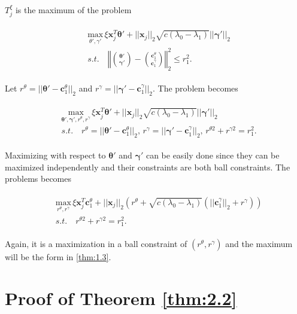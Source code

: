 $T_j^\xi$ is the maximum of the problem

\begin{gather}
    \begin{aligned}
        &\underset{\theta',\gamma'}{\mathrm{max}}\,\xi \boldsymbol x_j^T\boldsymbol\theta'+||\boldsymbol x_j||_2\sqrt{c(\lambda_0-\lambda_1)}||\boldsymbol\gamma'||_2\\
        &s.t.\quad \left\Vert\binom{\boldsymbol\theta'}{\boldsymbol\gamma'}-\binom{\boldsymbol c_1^\theta}{\boldsymbol c_1^\gamma}\right\Vert^2_2\leq r_1^2.
    \end{aligned}
\end{gather}

Let $r^\theta=||\boldsymbol\theta'-\boldsymbol c_1^\theta||_2$ and $r^\gamma=||\boldsymbol\gamma'-\boldsymbol c_1^\gamma||_2$. The problem becomes

\begin{gather}
    \begin{aligned}
        &\underset{\boldsymbol\theta',\boldsymbol\gamma',r^\theta,r^\gamma}{\mathrm{max}}\,\xi \boldsymbol x_j^T\boldsymbol\theta'+||\boldsymbol x_j||_2\sqrt{c(\lambda_0-\lambda_1)}||\boldsymbol\gamma'||_2\\
        &s.t.\quad r^\theta=||\boldsymbol\theta'-\boldsymbol c_1^\theta||_2,\,r^\gamma=||\boldsymbol\gamma'-\boldsymbol c_1^\gamma||_2,\,r^{\theta2}+r^{\gamma2}=r_1^2.
    \end{aligned}
\end{gather}

Maximizing with respect to $\boldsymbol\theta'$ and $\boldsymbol\gamma'$ can be easily done since they can be maximized independently and their constraints are both ball constraints. The problems becomes

\begin{gather}
    \begin{aligned}
        &\underset{r^\theta,r^\gamma}{\mathrm{max}}\,\xi \boldsymbol x_j^T\boldsymbol c_1^\theta+||\boldsymbol x_j||_2\left(r^\theta+\sqrt{c(\lambda_0-\lambda_1)}(||\boldsymbol c_1^\gamma||_2+r^\gamma)\right)\\
        &s.t.\quad r^{\theta2}+r^{\gamma2}=r_1^2.
    \end{aligned}
\end{gather}

Again, it is a maximization in a ball constraint of $(r^\theta,r^\gamma)$ and the maximum will be the form in \ref{thm:1.3}. 

\section{Proof of Theorem \ref{thm:2.2}}

